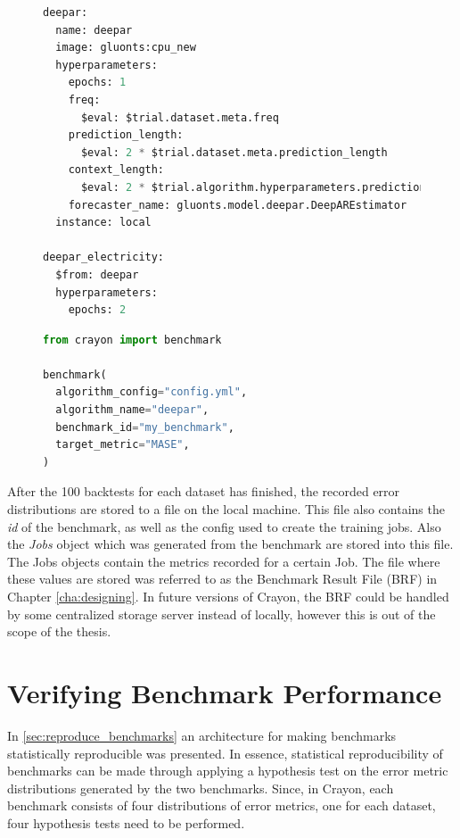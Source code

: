 \begin{figure}
  \begin{lstlisting}[language=Python, label={config:benchmarking}, caption={Config file for benchmarking with Crayon. Note that \textit{deepar\_electricity} has a different hyperparameter configuration thus these hyperparameters are used when benchmarking the algorithm on the electricity dataset. For all other datasets, the default algorithm definition \textit{deepar} is used.}]
deepar:
  name: deepar
  image: gluonts:cpu_new
  hyperparameters:
    epochs: 1
    freq:
      $eval: $trial.dataset.meta.freq
    prediction_length:
      $eval: 2 * $trial.dataset.meta.prediction_length
    context_length:
      $eval: 2 * $trial.algorithm.hyperparameters.prediction_length
    forecaster_name: gluonts.model.deepar.DeepAREstimator    
  instance: local

deepar_electricity:
  $from: deepar
  hyperparameters:
    epochs: 2
    \end{lstlisting}

  \begin{lstlisting}[language=Python, label={code:benchmarking}, caption={Python script for starting a benchmarking run using Crayon.}]
from crayon import benchmark

benchmark(
  algorithm_config="config.yml",
  algorithm_name="deepar",
  benchmark_id="my_benchmark",
  target_metric="MASE",
)
    \end{lstlisting}
\end{figure}

After the 100 backtests for each dataset has finished, the recorded error distributions are stored to a file on the local machine. This file also contains the \textit{id} of the benchmark, as well as the config used to create the training jobs. Also the \textit{Jobs} object which was generated from the benchmark are stored into this file. The Jobs objects contain the metrics recorded for a certain Job. The file where these values are stored was referred to as the Benchmark Result File (BRF) in Chapter \ref{cha:designing}. In future versions of Crayon, the BRF could be handled by some centralized storage server instead of locally, however this is out of the scope of the thesis.

\section{Verifying Benchmark Performance}
In \ref{sec:reproduce_benchmarks} an architecture for making benchmarks statistically reproducible was presented. In essence, statistical reproducibility of benchmarks can be made through applying a hypothesis test on the error metric distributions generated by the two benchmarks. Since, in Crayon, each benchmark consists of four distributions of error metrics, one for each dataset, four hypothesis tests need to be performed.

